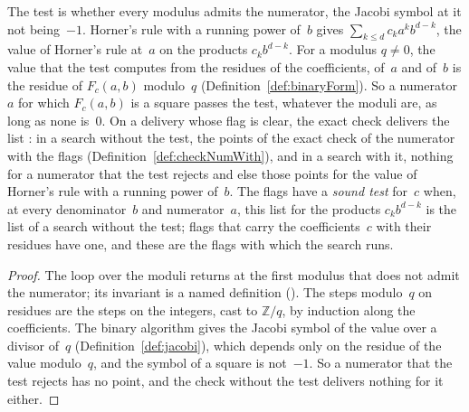 \begin{lemma}\label{lem:modTest}
  \leanok
  The test is whether every modulus admits the numerator, the Jacobi symbol at it not being~$-1$.
  Horner's rule with a running power of~$b$ gives $\sum_{k \le d} c_k a^k b^{d-k}$, the value of
  Horner's rule at~$a$ on the products $c_k b^{d-k}$. For a modulus $q \ne 0$, the value that the
  test computes from the residues of the coefficients, of~$a$ and of~$b$ is the residue of
  $F_c(a, b)$ modulo~$q$ (Definition~\ref{def:binaryForm}). So a numerator~$a$ for which $F_c(a, b)$
  is a square passes the test, whatever the moduli are, as long as none is~$0$. On a delivery whose
  flag is clear, the exact check delivers the list : in a search
  without the test, the points of the exact check of the numerator with the flags
  (Definition~\ref{def:checkNumWith}), and in a search with it, nothing for a numerator that the
  test rejects and else those points for the value of Horner's rule with a running power of~$b$. The
  flags have a \emph{sound test} for~$c$ when, at every denominator~$b$ and numerator~$a$, this list
  for the products $c_k b^{d-k}$ is the list of a search without the test; flags that carry the
  coefficients~$c$ with their residues have one, and these are the flags with which the search runs.
\end{lemma}

\begin{proof}
  \leanok
  The loop over the moduli returns at the first modulus that does not admit the numerator; its
  invariant is a named definition (). The steps modulo~$q$ on
  residues are the steps on the integers, cast to $\mathbb{Z}/q$, by induction along the
  coefficients. The binary algorithm gives the Jacobi symbol of the value over a divisor of~$q$
  (Definition~\ref{def:jacobi}), which depends only on the residue of the value modulo~$q$, and the
  symbol of a square is not~$-1$. So a numerator that the test rejects has no point, and the check
  without the test delivers nothing for it either.
\end{proof}

